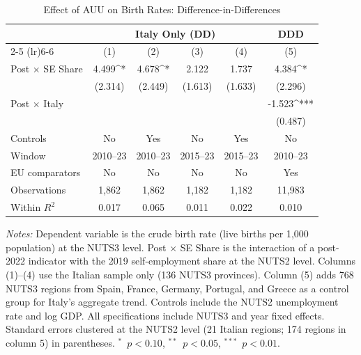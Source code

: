 \begin{table}[t]
\centering
\caption{Effect of AUU on Birth Rates: Difference-in-Differences}
\label{tab:main}
\small
\begin{tabular}{lccccc}
\toprule
& \multicolumn{4}{c}{Italy Only (DD)} & DDD \\
\cmidrule(lr){2-5} \cmidrule(lr){6-6}
& (1) & (2) & (3) & (4) & (5) \\
\midrule
Post $\times$ SE Share & 4.499^{*} & 4.678^{*} & 2.122 & 1.737 & 4.384^{*} \\
 & (2.314) & (2.449) & (1.613) & (1.633) & (2.296) \\
Post $\times$ Italy & & & & & -1.523^{***} \\
 & & & & & (0.487) \\
\midrule
Controls & No & Yes & No & Yes & No \\
Window & 2010--23 & 2010--23 & 2015--23 & 2015--23 & 2010--23 \\
EU comparators & No & No & No & No & Yes \\
Observations & 1,862 & 1,862 & 1,182 & 1,182 & 11,983 \\
Within $R^2$ & 0.017 & 0.065 & 0.011 & 0.022 & 0.010 \\
\bottomrule
\end{tabular}
\par\vspace{0.3em}\begin{flushleft}\small
\textit{Notes:} Dependent variable is the crude birth rate (live births per 1,000 population) at the NUTS3 level. Post $\times$ SE Share is the interaction of a post-2022 indicator with the 2019 self-employment share at the NUTS2 level. Columns (1)--(4) use the Italian sample only (136 NUTS3 provinces). Column (5) adds 768 NUTS3 regions from Spain, France, Germany, Portugal, and Greece as a control group for Italy's aggregate trend. Controls include the NUTS2 unemployment rate and log GDP. All specifications include NUTS3 and year fixed effects. Standard errors clustered at the NUTS2 level (21 Italian regions; 174 regions in column 5) in parentheses. $^{*}$~$p<0.10$, $^{**}$~$p<0.05$, $^{***}$~$p<0.01$.
\end{flushleft}
\end{table}
